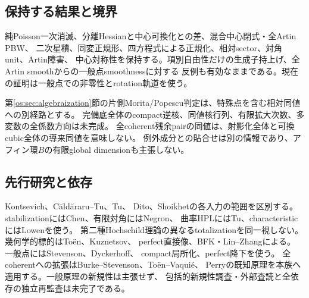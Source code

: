 \subsection{保持する結果と境界}
純Poisson一次消滅、分離Hessianと中心可換化との差、混合中心閉式・全Artin PBW、
二次星積、同変正規形、四方程式による正規化、相対sector、対角unit、Artin障害、
中心対称性を保持する。項別自由性だけの生成子持上げ、全Artin smoothからの一般点smoothnessに対する
反例も有効なままである。現在の証明は一般点での非零性とrotation軌道を使う。

第\ref{os:sec:algebraization}節の片側Morita/Popescu判定は、特殊点を含む相対同値への別経路とする。
完備底全体のcompact逆核、同値核行列、有限拡大次数、多変数の全係数方向は未完成。
全coherent残余pairの同値は、射影化全体と可換cubic全体の導来同値を意味しない。
例外成分との貼合せは別の情報であり、アフィン環$B$の有限global dimensionも主張しない。

\subsection{先行研究と依存}
Kontsevich\cite{PKontsevich}、C\u{a}ld\u{a}raru--Tu\cite{CT}、Tu\cite{CGTu}、
Dito\cite{KJDito}、Shoikhet\cite{KJShoikhet}の各入力の範囲を区別する。
stabilizationにはChen\cite{AMChen}、有限対角にはNegron\cite{MBNegron}、
曲率HPLにはTu\cite{MBTu}、characteristicにはLowen\cite{MBLowen}を使う。
第二種Hochschild理論\cite{CDGHLR,RDPP}の異なるtotalizationを同一視しない。
幾何学的標的はTo\"en\cite{GRToen}、Kuznetsov\cite{GRKuznetsov}、
perfect直接像\cite{GRStacks}、BFK・Lin--Zhang\cite{GRBFK,GRLZ}による。
一般点にはStevenson\cite{ROGStevenson}、Dyckerhoff\cite{ROGDyckerhoff}、
compact局所化\cite{ROGStacks}、perfect降下\cite{ROGTV}を使う。
全coherentへの拡張はBurke--Stevenson\cite{CRSBS}、To\"en--Vaqui\'e\cite{CRSTV}、
Perry\cite{CRSPerry}の既知原理を本族へ適用する。一般原理の新規性は主張せず、
包括的新規性調査・外部査読と全依存の独立再監査は未完了である。


